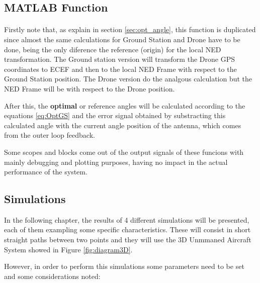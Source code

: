 \subsection*{MATLAB Function}
\paragraph{}Firstly note that, as explain in section \ref{sec:opt_angle}, this function is duplicated since almost the same calculations for Ground Station and Drone have to be done, being the only diference the reference (origin) for the local NED transformation.
The Ground station version will transform the Drone GPS coordinates to ECEF and then to the local NED Frame with respect to the Ground Station position. The Drone version do the analgous calculation but the NED Frame will be with respect to the Drone position.

After this, the \textbf{optimal} or {reference} angles will be calculated according to the equations \ref{eq:OptGS} and the error signal obtained by substracting this calculated angle with the current angle position of the antenna, which comes from the outer loop feedback.

Some scopes and blocks come out of the output signals of these funcions with mainly debugging and plotting purposes, having no impact in the actual performance of the system. 

\subsection*{Simulations}

In the following chapter, the results of 4 different simulations will be presented, each of them exampling some specific characteristics. These will consist in short straight paths between two points and they will use the 3D Unmmaned Aircraft System showed in Figure \ref{fig:diagram3D}.

However, in order to perform this simulations some parameters need to be set and some considerations noted:

